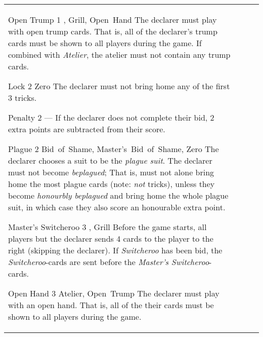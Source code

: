 \begin{table}
\begin{center}
\begin{tabularx}{\textwidth}{
			l
			S[table-number-alignment=center, table-figures-decimal=0]
			p{3cm}
			|X
		}
			\specialBidItem%
			{Open Trump}
			{1}
			{\nonTrump, Grill, Open~Hand}
			{%
				The declarer must play with open trump cards. That is, all of the declarer’s trump cards must be shown to all players during the game. If combined with \emph{Atelier}, the atelier must not contain any trump cards.
			}

			\specialBidItem%
			{Lock}
			{2}
			{Zero}
			{%
				The declarer must not bring home any of the first 3 tricks.
			}

			\specialBidItem%
			{Penalty}
			{2}
			{---}
			{%
				If the declarer does not complete their bid, 2 extra points are subtracted from their score.
			}

			\specialBidItem%
			{Plague}
			{2}
			{Bid~of~Shame, Master's~Bid~of~Shame, Zero}
			{%
				The declarer chooses a suit to be the \emph{plague suit}. The declarer must not become \emph{beplagued}; That is, must not alone bring home the most plague cards (note: \emph{not} tricks), unless they become \emph{honourbly beplagued} and bring home the whole plague suit, in which case they also score an honourable extra point.
			}

			\specialBidItem%
			{Master's Switcheroo}
			{3}
			{\nonTrump, Grill}
			{%
				Before the game starts, all players but the declarer sends 4 cards to the player to the right (skipping the declarer). If \emph{Switcheroo} has been bid, the \emph{Switcheroo}-cards are sent before the \emph{Master's Switcheroo}-cards.
			}

			\specialBidItem%
			{Open Hand}
			{3}
			{Atelier, Open~Trump}
			{%
				The declarer must play with an open hand. That is, all of the their cards must be shown to all players during the game.
			}
		\end{tabularx}
	\end{center}
\end{table}
